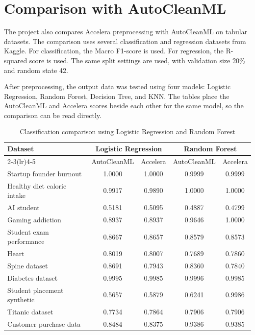 \documentclass[12pt,a4paper,oneside]{report}
\begin{document}
\section{Comparison with AutoCleanML}

The project also compares Accelera preprocessing with AutoCleanML on tabular
datasets. The comparison uses several classification and regression datasets
from Kaggle. For classification, the Macro F1-score is used. For regression,
the R-squared score is used. The same split settings are used, with validation
size 20\% and random state 42.

After preprocessing, the output data was tested using four models: Logistic
Regression, Random Forest, Decision Tree, and KNN. The tables place the
AutoCleanML and Accelera scores beside each other for the same model, so the
comparison can be read directly.

\begin{table}[H]
\centering
\small
\caption{Classification comparison using Logistic Regression and Random Forest}
\label{tab:classification-lr-rf-autoclean-accelera}
\begin{tabular}{p{}cccc}
\toprule
Dataset & \multicolumn{2}{c}{Logistic Regression} & \multicolumn{2}{c}{Random Forest} \\
\cmidrule(lr){2-3}\cmidrule(lr){4-5}
 & AutoCleanML & Accelera & AutoCleanML & Accelera \\
\midrule
Startup founder burnout & 1.0000 & 1.0000 & 0.9999 & 0.9999 \\
Healthy diet calorie intake & 0.9917 & 0.9890 & 1.0000 & 1.0000 \\
AI student & 0.5181 & 0.5095 & 0.4887 & 0.4799 \\
Gaming addiction & 0.8937 & 0.8937 & 0.9646 & 1.0000 \\
Student exam performance & 0.8667 & 0.8657 & 0.8579 & 0.8573 \\
Heart & 0.8019 & 0.8007 & 0.7689 & 0.7860 \\
Spine dataset & 0.8691 & 0.7943 & 0.8360 & 0.7840 \\
Diabetes dataset & 0.9995 & 0.9985 & 0.9996 & 0.9985 \\
Student placement synthetic & 0.5657 & 0.5879 & 0.6241 & 0.9986 \\
Titanic dataset & 0.7734 & 0.7864 & 0.7906 & 0.7906 \\
Customer purchase data & 0.8484 & 0.8375 & 0.9386 & 0.9385 \\
\bottomrule
\end{tabular}
\end{table}
\end{document}
